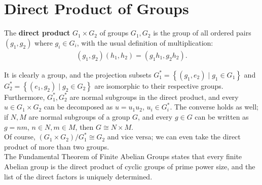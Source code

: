 \documentclass{memoir}
\begin{document}
\section{Direct Product of Groups}	
\begin{defn}
	The \textbf{direct product} \(G_1\times G_2\) of groups \(G_1,G_2\) is the group of all ordered pairs \((g_1,g_2)\) where \(g_i \in G_i\), with the usual definition of multiplication:
	\begin{align*}
		(g_1,g_2)(h_1,h_2) = (g_1h_1,g_2h_2).
	\end{align*}
\end{defn}
	It is clearly a group, and the projection subsets \(G_1^{*}= \left\{(g_1,e_2) \mid g_1 \in G_1 \right\} \) and \(G_2^{*}=\left\{(e_1,g_2) \mid g_2 \in G_2 \right\} \) are isomorphic to their respective groups.\\

Furthermore, \(G_1^{*},G_2^{*}\) are normal subgroups  in the direct product, and every \(u \in G_1\times G_2\) can be decomposed as \(u = u_1u_2\), \(u_i \in G_i^{*}\). The converse holds as well; if \(N,M\) are normal subgroups of a group \(G\), and every \(g \in G\) can be written as \(g = nm\), \(n \in N, m \in M\), then \(G \cong N\times M\).\\

Of course, \((G_1\times G_2) / G_1^{*} \cong G_2\) and vice versa; we can even take the direct product of more than two groups.\\

The Fundamental Theorem of Finite Abelian Groups states that every finite Abelian group is the direct product of cyclic groups of prime power size, and the list of the direct factors is uniquely determined.
\end{document}

